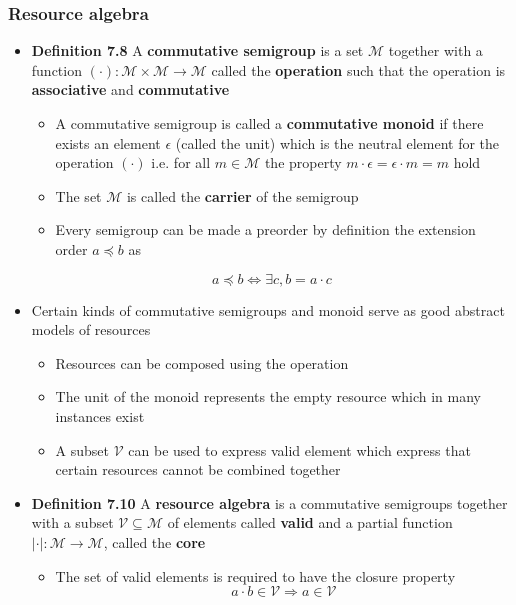 \subsubsection{Resource algebra}
\begin{itemize}
  \item \textbf{Definition 7.8} A \textbf{commutative semigroup} is a set $\mathcal M$ together with a function $(\cdot): \mathcal M \times \mathcal M \to \mathcal M$ called the \textbf{operation} such that the operation is \textbf{associative} and \textbf{commutative}
  \begin{itemize}
  	\item A commutative semigroup is called a \textbf{commutative monoid} if there exists an element $\epsilon$ (called the unit) which is the neutral element for the operation $(\cdot)$ i.e. for all $m \in \mathcal M$ the property $m \cdot \epsilon = \epsilon \cdot m = m$ hold
  	\item The set $\mathcal M$ is called the \textbf{carrier} of the semigroup
  	\item Every semigroup can be made a preorder by definition the extension order $a \preccurlyeq b$ as
  \end{itemize}
  \begin{equation*}
    a \preccurlyeq b \Leftrightarrow \exists c, b=a \cdot c
  \end{equation*}
  \item Certain kinds of commutative semigroups and monoid serve as good abstract models of resources
  \begin{itemize}
  	\item Resources can be composed using the operation
  	\item The unit of the monoid represents the empty resource which in many instances exist
  	\item A subset $\mathcal V$ can be used to express valid element which express that certain resources cannot be combined together
  \end{itemize}
  \item \textbf{Definition 7.10} A \textbf{resource algebra} is a commutative semigroups together with a subset $\mathcal V \subseteq \mathcal M$ of elements called \textbf{valid} and a partial function $|\cdot|:\mathcal M \to \mathcal M$, called the \textbf{core}
  \begin{itemize}
  	\item The set of valid elements is required to have the closure property
    \[
      a \cdot b \in \mathcal{V} \Rightarrow a \in \mathcal{V}
\]
\end{itemize}
\end{itemize}
